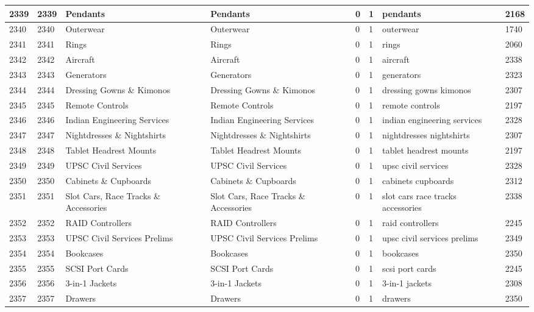 \begin{longtable}{|l|l|l|l|l|l|l|l|}
2339 & 2339 & Pendants & Pendants & 0 & 1 & pendants & 2168 \\ \hline 
2340 & 2340 & Outerwear & Outerwear & 0 & 1 & outerwear & 1740 \\ \hline 
2341 & 2341 & Rings & Rings & 0 & 1 & rings & 2060 \\ \hline 
2342 & 2342 & Aircraft & Aircraft & 0 & 1 & aircraft & 2338 \\ \hline 
2343 & 2343 & Generators & Generators & 0 & 1 & generators & 2323 \\ \hline 
2344 & 2344 & Dressing Gowns \& Kimonos & Dressing Gowns \& Kimonos & 0 & 1 & dressing gowns kimonos & 2307 \\ \hline 
2345 & 2345 & Remote Controls & Remote Controls & 0 & 1 & remote controls & 2197 \\ \hline 
2346 & 2346 & Indian Engineering Services & Indian Engineering Services & 0 & 1 & indian engineering services & 2328 \\ \hline 
2347 & 2347 & Nightdresses \& Nightshirts & Nightdresses \& Nightshirts & 0 & 1 & nightdresses nightshirts & 2307 \\ \hline 
2348 & 2348 & Tablet Headrest Mounts & Tablet Headrest Mounts & 0 & 1 & tablet headrest mounts & 2197 \\ \hline 
2349 & 2349 & UPSC Civil Services & UPSC Civil Services & 0 & 1 & upsc civil services & 2328 \\ \hline 
2350 & 2350 & Cabinets \& Cupboards & Cabinets \& Cupboards & 0 & 1 & cabinets cupboards & 2312 \\ \hline 
2351 & 2351 & Slot Cars, Race Tracks \& Accessories & Slot Cars, Race Tracks \& Accessories & 0 & 1 & slot cars race tracks accessories & 2338 \\ \hline 
2352 & 2352 & RAID Controllers & RAID Controllers & 0 & 1 & raid controllers & 2245 \\ \hline 
2353 & 2353 & UPSC Civil Services Prelims & UPSC Civil Services Prelims & 0 & 1 & upsc civil services prelims & 2349 \\ \hline 
2354 & 2354 & Bookcases & Bookcases & 0 & 1 & bookcases & 2350 \\ \hline 
2355 & 2355 & SCSI Port Cards & SCSI Port Cards & 0 & 1 & scsi port cards & 2245 \\ \hline 
2356 & 2356 & 3-in-1 Jackets & 3-in-1 Jackets & 0 & 1 & 3-in-1 jackets & 2308 \\ \hline 
2357 & 2357 & Drawers & Drawers & 0 & 1 & drawers & 2350 \\ \hline 

\end{longtable}
